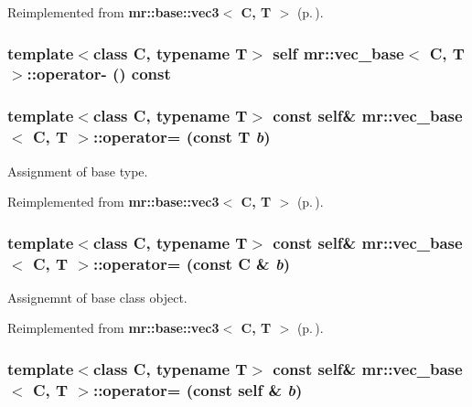 Reimplemented from {\bf mr::base::vec3$<$ C, T $>$} {\rm (p.\,\pageref{structmr_1_1base_1_1vec3_z40_7})}.
\subsubsection{\setlength{\rightskip}{0pt plus 5cm}template$<$class C, typename T$>$ {\bf self} {\bf mr::vec\_\-base}$<$ C, T $>$::operator- () const\hspace{0.3cm}{\tt  [inline]}}\label{structmr_1_1vec__base_a17}


\subsubsection{\setlength{\rightskip}{0pt plus 5cm}template$<$class C, typename T$>$ const {\bf self}\& {\bf mr::vec\_\-base}$<$ C, T $>$::operator= (const T {\em b})\hspace{0.3cm}{\tt  [inline]}}\label{structmr_1_1vec__base_z60_3}


Assignment of base type. 



Reimplemented from {\bf mr::base::vec3$<$ C, T $>$} {\rm (p.\,\pageref{structmr_1_1base_1_1vec3_z36_3})}.
\subsubsection{\setlength{\rightskip}{0pt plus 5cm}template$<$class C, typename T$>$ const {\bf self}\& {\bf mr::vec\_\-base}$<$ C, T $>$::operator= (const C \& {\em b})\hspace{0.3cm}{\tt  [inline]}}\label{structmr_1_1vec__base_z60_2}


Assignemnt of base class object. 



Reimplemented from {\bf mr::base::vec3$<$ C, T $>$} {\rm (p.\,\pageref{structmr_1_1base_1_1vec3_z36_2})}.
\subsubsection{\setlength{\rightskip}{0pt plus 5cm}template$<$class C, typename T$>$ const {\bf self}\& {\bf mr::vec\_\-base}$<$ C, T $>$::operator= (const {\bf self} \& {\em b})\hspace{0.3cm}{\tt  [inline]}}\label{structmr_1_1vec__base_z60_1}


